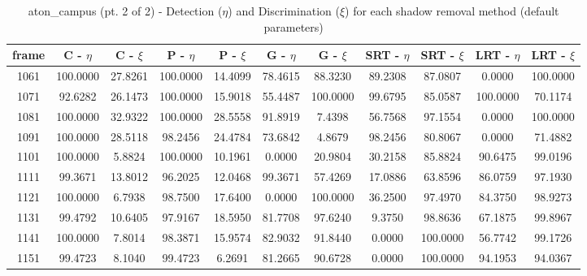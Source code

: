 \begin{appendices}
\begin{table}
\begin{tabular}{ |c|c|c|c|c|c|c|c|c|c|c| }
\hline
\end{tabular}

\end{table}

\begin{table}
\centering
\caption{aton\_campus (pt. 2 of 2) - Detection ($\eta$) and Discrimination ($\xi$) for each shadow removal method (default parameters)}
\begin{tabular}{ |c|c|c|c|c|c|c|c|c|c|c| }
	\hline
\textbf{frame} &  \textbf{C - $\eta$} &  \textbf{C - $\xi$} &  \textbf{P - $\eta$} &  \textbf{P - $\xi$} &  \textbf{G - $\eta$} &  \textbf{G - $\xi$} &  \textbf{SRT - $\eta$} &  \textbf{SRT - $\xi$} &  \textbf{LRT - $\eta$} &  \textbf{LRT - $\xi$} \\
\hline
\hline
1061 &  100.0000 &  27.8261 &   100.0000 &  14.4099 &   78.4615 &  88.3230 &   89.2308 &  87.0807 &   0.0000 &  100.0000    \\
\hline
1071 &  92.6282 &  26.1473 &   100.0000 &  15.9018 &   55.4487 &  100.0000 &   99.6795 &  85.0587 &   100.0000 &  70.1174    \\
\hline
1081 &  100.0000 &  32.9322 &   100.0000 &  28.5558 &   91.8919 &  7.4398 &   56.7568 &  97.1554 &   0.0000 &  100.0000   \\
\hline
1091 &  100.0000 &  28.5118 &   98.2456 &  24.4784 &   73.6842 &  4.8679 &   98.2456 &  80.8067 &   0.0000 &  71.4882    \\
\hline
1101 &  100.0000 &  5.8824 &   100.0000 &  10.1961 &   0.0000 &  20.9804 &   30.2158 &  85.8824 &   90.6475 &  99.0196    \\
\hline
1111 &  99.3671 &  13.8012 &   96.2025 &  12.0468 &   99.3671 &  57.4269 &   17.0886 &  63.8596 &   86.0759 &  97.1930    \\
\hline
1121 &  100.0000 &  6.7938 &   98.7500 &  17.6400 &   0.0000 &  100.0000 &   36.2500 &  97.4970 &   84.3750 &  98.9273    \\
\hline
1131 &  99.4792 &  10.6405 &   97.9167 &  18.5950 &   81.7708 &  97.6240 &   9.3750 &  98.8636 &   67.1875 &  99.8967    \\
\hline
1141 &  100.0000 &  7.8014 &   98.3871 &  15.9574 &   82.9032 &  91.8440 &   0.0000 &  100.0000 &   56.7742 &  99.1726   \\
\hline
1151 &  99.4723 &  8.1040 &   99.4723 &  6.2691 &   81.2665 &  90.6728 &   0.0000 &  100.0000 &   94.1953 &  94.0367   \\


\end{tabular}
\end{table}
\end{appendices}
